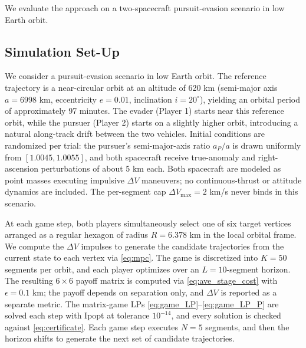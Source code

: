 

We evaluate the approach on a two-spacecraft pursuit-evasion scenario in low Earth orbit.

\subsection{Simulation Set-Up}

We consider a pursuit-evasion scenario in low Earth orbit. The reference trajectory is a near-circular orbit at an altitude of 620 km (semi-major axis $a = 6998$ km, eccentricity $e = 0.01$, inclination $i = 20^\circ$), yielding an orbital period of approximately 97 minutes. The evader (Player 1) starts near this reference orbit, while the pursuer (Player 2) starts on a slightly higher orbit, introducing a natural along-track drift between the two vehicles. Initial conditions are randomized per trial: the pursuer's semi-major-axis ratio $a_P/a$ is drawn uniformly from $[1.0045, 1.0055]$, and both spacecraft receive true-anomaly and right-ascension perturbations of about 5 km each. Both spacecraft are modeled as point masses executing impulsive $\Delta V$ maneuvers; no continuous-thrust or attitude dynamics are included. The per-segment cap $\Delta V_{\max} = 2$ km/s never binds in this scenario.

At each game step, both players simultaneously select one of six target vertices arranged as a regular hexagon of radius $R = 6.378$ km in the local orbital frame.
We compute the $\Delta V$ impulses to generate the candidate trajectories from the current state to each vertex via \eqref{eq:mpc}.
The game is discretized into $K = 50$ segments per orbit, and each player optimizes over an $L=10$-segment horizon. The resulting $6 \times 6$ payoff matrix is computed via \eqref{eq:ave_stage_cost} with $\epsilon = 0.1$ km; the payoff depends on separation only, and $\Delta V$ is reported as a separate metric.
The matrix-game LPs \eqref{eq:game_LP}--\eqref{eq:game_LP_P} are solved each step with Ipopt \cite{wachter2006implementation} at tolerance $10^{-14}$, and every solution is checked against \eqref{eq:certificate}. Each game step executes $N=5$ segments, and then the horizon shifts to generate the next set of candidate trajectories.

